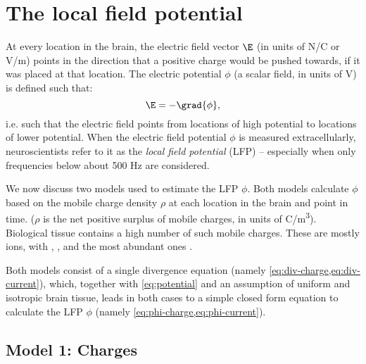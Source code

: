 \section{The local field potential}
\label{sec:LFP}

At every location in the brain, the electric field vector $\E$ (in units of N/C or V/m) points in the direction that a positive charge would be pushed towards, if it was placed at that location. The electric potential $\phi$ (a scalar field, in units of V) is defined such that:
%
\begin{equation}
\label{eq:potential}
\E = -\grad{\phi},
\end{equation}
%
i.e. such that the electric field points from locations of high potential to locations of lower potential.\footnotemark{} When the electric field potential $\phi$ is measured extracellularly, neuroscientists refer to it as the \emph{local field potential} (LFP) -- especially when only frequencies below about 500 Hz are considered.


We now discuss two models used to estimate the LFP $\phi$. Both models calculate $\phi$ based on the mobile charge density $\rho$ at each location in the brain and point in time. ($\rho$ is the net positive surplus of mobile charges, in units of C/\si{\metre^3}). Biological tissue contains a high number of such mobile charges. These are mostly ions, with , , and  the most abundant ones \cite{Martinsen2015a}.

Both models consist of a single divergence equation (namely \cref{eq:div-charge,eq:div-current}), which, together with \cref{eq:potential} and an assumption of uniform and isotropic brain tissue, leads in both cases to a simple closed form equation to calculate the LFP $\phi$ (namely \cref{eq:phi-charge,eq:phi-current}).



\subsection{Model 1: Charges}

